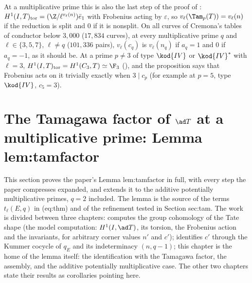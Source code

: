 At a multiplicative prime this is also the last step of the proof of : $H^1(I,T)_{\mathrm{tor}}=(\Z/\ell^{v_\ell(n)})\bar e_1$ with Frobenius acting by $\varepsilon$, so
$v_\ell(\Tam_p(T))=v_\ell(n)$ if the reduction is split and $0$ if it is nonsplit. On all curves of Cremona's tables of conductor below $3{,}000$ ($17{,}834$ curves), at every
multiplicative prime $q$ and $\ell\in\{3,5,7\}$, $\ell\ne q$ ($101{,}336$ pairs), $v_\ell(c_q)$ is $v_\ell(n_q)$ if $a_q=1$ and $0$ if $a_q=-1$, as it should be. At a prime $p\ne3$ of type $\kod{IV}$ or
$\kod{IV}^*$ with $\ell=3$, $H^1(I,T)_{\mathrm{tor}}=H^1(C_3,T)\simeq\F_3$ (), and the proposition says that Frobenius acts on it trivially exactly when
$3\mid c_p$ (for example  at $p=5$, type $\kod{IV}$, $c_5=3$).

\section[Lemma lem:tamfactor]{The Tamagawa factor of \texorpdfstring{$\ad T$}{ad T} at a multiplicative prime: Lemma lem:tamfactor}\label{sec:blochkato:tamfactor}

This section proves the paper's Lemma lem:tamfactor in full, with every step the paper compresses expanded, and extends it to the additive potentially
multiplicative primes, $q=2$ included. The lemma is the source of the terms $t_\ell(E,q)$ in (eq:thm) and of the refinement tested in Section sec:tam. The work is
divided between three chapters:  computes the group cohomology of the Tate shape (the model computation: $H^1(I,\ad T)$, its torsion, the Frobenius
action and the invariants, for arbitrary corner values $n'$ and $c'$);  identifies $c'$ through the Kummer cocycle of $q_E$ and its indeterminacy
$(n,q-1)$; this chapter is the home of the lemma itself: the identification with the Tamagawa factor, the assembly, and the additive potentially multiplicative case.
The other two chapters state their results as corollaries pointing here.

